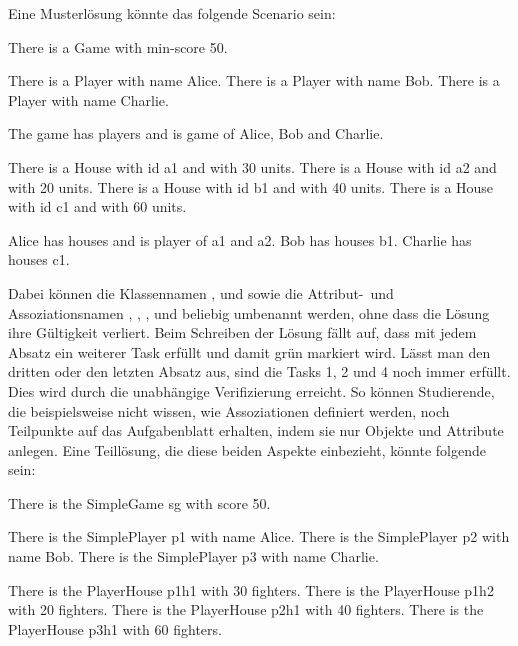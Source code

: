 Eine Musterlösung könnte das folgende Scenario sein:

\begin{mdcodeblock}
    There is a Game with min-score 50.

    There is a Player with name Alice.
    There is a Player with name Bob.
    There is a Player with name Charlie.

    The game has players and is game of Alice, Bob and Charlie.

    There is a House with id a1 and with 30 units.
    There is a House with id a2 and with 20 units.
    There is a House with id b1 and with 40 units.
    There is a House with id c1 and with 60 units.

    Alice has houses and is player of a1 and a2.
    Bob has houses b1.
    Charlie has houses c1.
\end{mdcodeblock}

Dabei können die Klassennamen ,  und  sowie die Attribut-\ und Assoziationsnamen , , ,  und  beliebig umbenannt werden, ohne dass die Lösung ihre Gültigkeit verliert.
Beim Schreiben der Lösung fällt auf, dass mit jedem Absatz ein weiterer Task erfüllt und damit grün markiert wird.
Lässt man den dritten oder den letzten Absatz aus, sind die Tasks 1, 2 und 4 noch immer erfüllt.
Dies wird durch die unabhängige Verifizierung erreicht.
So können Studierende, die beispielsweise nicht wissen, wie Assoziationen definiert werden, noch Teilpunkte auf das Aufgabenblatt erhalten, indem sie nur Objekte und Attribute anlegen.
Eine Teillösung, die diese beiden Aspekte einbezieht, könnte folgende sein:

\begin{mdcodeblock}
    There is the SimpleGame sg with score 50.

    There is the SimplePlayer p1 with name Alice.
    There is the SimplePlayer p2 with name Bob.
    There is the SimplePlayer p3 with name Charlie.

    There is the PlayerHouse p1h1 with 30 fighters.
    There is the PlayerHouse p1h2 with 20 fighters.
    There is the PlayerHouse p2h1 with 40 fighters.
    There is the PlayerHouse p3h1 with 60 fighters.
\end{mdcodeblock}
